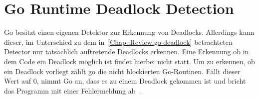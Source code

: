 \section{Go Runtime Deadlock Detection}
Go besitzt einen eigenen Detektor zur Erkennung von Deadlocks. Allerdings kann 
dieser, im Unterschied zu dem in~\ref{Chap::Review:go-deadlock} betrachteten 
Detector nur tatsächlich auftretende Deadlocks erkennen. Eine Erkennung ob 
in dem Code ein Deadlock möglich ist findet hierbei nicht statt. Um zu erkennen,
ob ein Deadlock vorliegt zählt go die nicht blockierten Go-Routinen.
Fällt dieser Wert auf $0$, nimmt Go an, dass es zu einem Deadlock gekommen 
ist und bricht das Programm mit einer Fehlermeldung ab~\cite{grdd_code}.